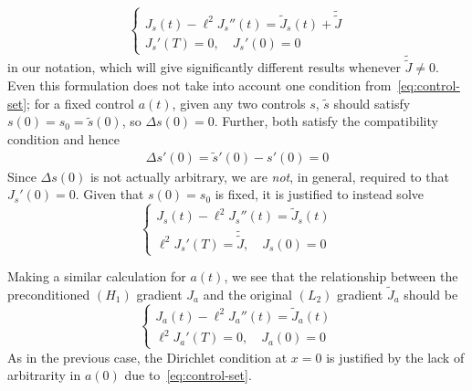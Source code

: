 \documentclass[letterpaper, 10pt, draft]{amsart}
\theoremstyle{definition}
\theoremstyle{remark}
\begin{document}
\begin{equation*}
  \begin{cases}
    J_s(t) - \ell^2 J_s''(t) = \tilde{J}_s(t) + \tilde{\tilde{J}}
    \\
    J_s'(T) = 0,\quad
    J_s'(0) = 0
  \end{cases}
\end{equation*}
in our notation, which will give significantly different results whenever
$\tilde{\tilde{J}}\neq 0$.
Even this formulation does not take into account one condition
from~\eqref{eq:control-set}; for a fixed control $a(t)$, given any two controls
$s$, $\tilde{s}$ should satisfy $s(0)=s_0=\tilde{s}(0)$, so ${\Delta s}(0) = 0$.
Further, both satisfy the compatibility condition and hence
\begin{gather*}
  {\Delta s}'(0) = \tilde{s}'(0) - s'(0) = 0
\end{gather*}
Since ${\Delta s}(0)$ is not actually arbitrary, we are \emph{not}, in general,
required to that $J_s'(0)=0$.
Given that $s(0)=s_0$ is fixed, it is justified to instead solve
\begin{equation}
  \begin{cases}
  J_s(t) - \ell^2 J_s''(t) = \tilde{J}_s(t)
  \\
  \ell^2 J_s'(T) = \tilde{\tilde{J}},\quad
  J_s(0) = 0
\end{cases}\label{eq:gradient-s-precond}
\end{equation}

Making a similar calculation for $a(t)$, we see that the relationship between
the preconditioned $(H_1)$ gradient $J_a$ and the original $(L_2)$ gradient
$\tilde{J}_a$ should be
\begin{equation}
  \begin{cases}
  J_a(t) - \ell^2 J_a''(t) = \tilde{J}_a(t)\nonumber
  \\
  \ell^2 J_a'(T) = 0,\quad
  J_a(0) = 0
  \end{cases}\label{eq:gradient-a-precond}
\end{equation}
As in the previous case, the Dirichlet condition at $x=0$ is justified by the
lack of arbitrarity in $a(0)$ due to~\eqref{eq:control-set}.
\end{document}
